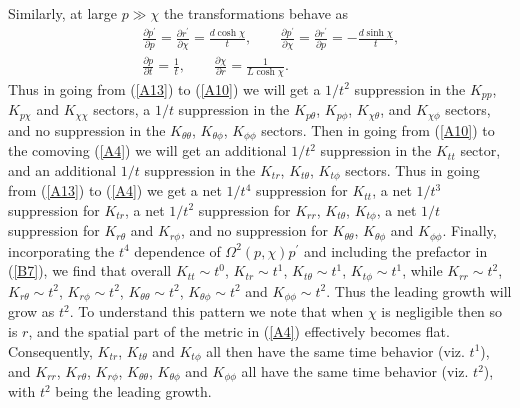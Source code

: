Similarly,  at large $p\gg \chi$ the transformations behave as 
%
\begin{eqnarray}
&&\frac{\partial p^{\prime }}{\partial p}=\frac{\partial r^{\prime }}{\partial \chi}=\frac{d\cosh\chi}{t},\qquad
\frac{\partial p^{\prime }}{\partial \chi}=\frac{\partial r^{\prime }}{\partial p}=-\frac{d\sinh\chi}{t}, 
\nonumber\\
&& \frac{\partial p}{\partial t}=\frac{1}{t},\qquad \frac{\partial \chi}{\partial r}=\frac{1}{L\cosh\chi}.
\label{B11}
\end{eqnarray}
%
Thus in going from (\ref{A13}) to (\ref{A10}) we will get a $1/t^2$ suppression in the $K_{pp}$, $K_{p\chi}$ and $K_{\chi\chi}$ sectors, a $1/t$ suppression in the $K_{p\theta}$, $K_{p\phi}$, $K_{\chi\theta}$, and $K_{\chi\phi}$ sectors, and no suppression in the $K_{\theta\theta}$, $K_{\theta  \phi}$, $K_{\phi\phi}$ sectors. Then in going from (\ref{A10}) to the comoving (\ref{A4}) we will get an additional $1/t^2$ suppression in the $K_{tt}$ sector,  and an additional  $1/t$ suppression in the $K_{tr}$, $K_{t\theta}$, $K_{t\phi}$ sectors. Thus in going from (\ref{A13}) to (\ref{A4}) we get a net $1/t^4$ suppression for  $K_{tt}$,  a net $1/t^3$ suppression for  $K_{tr}$, a net $1/t^2$ suppression for  $K_{rr}$, $K_{t\theta}$, $K_{t\phi}$, a net $1/t$ suppression for  $K_{r\theta}$ and $K_{r\phi}$, and no suppression for $K_{\theta\theta}$, $K_{\theta\phi}$ and $K_{\phi\phi}$. Finally, incorporating the $t^4$ dependence of $\Omega^2(p,\chi)p^{\prime}$ and including the prefactor in (\ref{B7}), we find that overall $K_{tt}\sim t^0$, $K_{tr}\sim t^1$, $K_{t\theta}\sim t^1$, $K_{t\phi}\sim t^1$, while $K_{rr}\sim t^2$, $K_{r\theta}\sim t^2$, $K_{r\phi}\sim t^2$,  $K_{\theta\theta}\sim t^2$, $K_{\theta\phi}\sim t^2$ and $K_{\phi\phi}\sim t^2$. Thus the leading growth will grow as $t^2$. To understand this pattern we note that when $\chi$ is negligible then so is $r$, and the spatial part of the metric in (\ref{A4}) effectively becomes flat. Consequently,  $K_{tr}$, $K_{t\theta}$ and $K_{t\phi}$ all then have the same time behavior (viz. $t^1$), and $K_{rr}$, $K_{r\theta}$, $K_{r\phi}$,  $K_{\theta\theta}$, $K_{\theta\phi}$ and $K_{\phi\phi}$  all have the same time behavior (viz. $t^2$), with $t^2$ being the leading growth.

